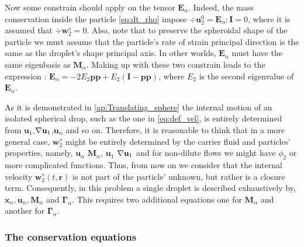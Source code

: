 Now some constrain should apply on the tensor $\textbf{E}_\alpha$.
Indeed, the mass conservation inside the particle \ref{eq:dt_rho} impose $\div \textbf{u}_2^0 = \textbf{E}_\alpha : \textbf{I}= 0$, where it is assumed that $\div \textbf{w}_2^s =0$. 
Also, note that to preserve the spheroidal shape of the particle we must assume that the particle's rate of strain principal direction is the same as the droplet's shape principal axis. 
In other worlds, $\textbf{E}_\alpha$ must have the same eigenbasis as $\textbf{M}_\alpha$. 
Making up with these two constrain leads to the expression : $\textbf{E}_\alpha = -2 E_2 \textbf{pp} + E_2 (\textbf{I}- \textbf{pp})$, where $E_2$ is the second eigenvalue of $\textbf{E}_\alpha$. 


As it is demonstrated in \ref{ap:Translating_sphere} the internal motion of an isolated spherical drop, such as the one in \ref{eq:def_vel}, is entirely determined  from $\textbf{u}_1$,$\mathbf{\nabla}\textbf{u}_1$,$\textbf{u}_\alpha$ and so on. 
Therefore, it is reasonable to think that in a more general case, $\textbf{w}_2^s$ might be entirely determined by the carrier fluid and particles' properties, namely, $\textbf{u}_\alpha$ $\textbf{M}_\alpha$, $\textbf{u}_1$ $\mathbf{\nabla}\textbf{u}_1$ and for non-dilute flows we might have $\phi_2$ or more complicated functions. 
Thus, from now on we consider that the internal velocity $\textbf{w}^{s}_2(t,\textbf{r})$ is not part of the particle' unknown, but rather is a closure term. 
Consequently, in this problem a single droplet is described exhaustively by, $\textbf{x}_\alpha, \textbf{u}_\alpha, \textbf{M}_\alpha$ and $\bm\Gamma_\alpha$. 
This requires two additional equations one for $\textbf{M}_\alpha$ and another for $\bm\Gamma_\alpha$. 

\subsubsection{The conservation equations}

